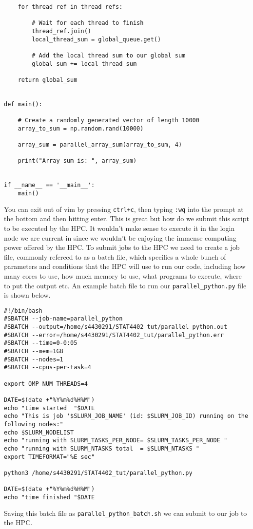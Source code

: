 \begin{verbatim}
    for thread_ref in thread_refs:

        # Wait for each thread to finish
        thread_ref.join()
        local_thread_sum = global_queue.get()

        # Add the local thread sum to our global sum
        global_sum += local_thread_sum

    return global_sum


def main():

    # Create a randomly generated vector of length 10000
    array_to_sum = np.random.rand(10000)

    array_sum = parallel_array_sum(array_to_sum, 4)

    print("Array sum is: ", array_sum)


if __name__ == '__main__':
    main()
\end{verbatim}

You can exit out of vim by pressing \texttt{ctrl+c}, then typing \texttt{:wq} into the prompt at the bottom and then hitting enter. This is great but how do we submit this script to be executed by the HPC. It wouldn't make sense to execute it in the login node we are current in since we wouldn't be enjoying the immense computing power offered by the HPC. To submit jobs to the HPC we need to create a job file, commonly refereed to as a batch file, which specifies a whole bunch of parameters and conditions that the HPC will use to run our code, including how many cores to use, how much memory to use, what programs to execute, where to put the output etc. An example batch file to run our \texttt{parallel\_python.py} file is shown below.
\begin{verbatim}
#!/bin/bash
#SBATCH --job-name=parallel_python
#SBATCH --output=/home/s4430291/STAT4402_tut/parallel_python.out
#SBATCH --error=/home/s4430291/STAT4402_tut/parallel_python.err
#SBATCH --time=0-0:05
#SBATCH --mem=1GB
#SBATCH --nodes=1
#SBATCH --cpus-per-task=4

export OMP_NUM_THREADS=4

DATE=$(date +"%Y%m%d%H%M")
echo "time started  "$DATE
echo "This is job '$SLURM_JOB_NAME' (id: $SLURM_JOB_ID) running on the following nodes:"
echo $SLURM_NODELIST
echo "running with SLURM_TASKS_PER_NODE= $SLURM_TASKS_PER_NODE "
echo "running with SLURM_NTASKS total  = $SLURM_NTASKS "
export TIMEFORMAT="%E sec"

python3 /home/s4430291/STAT4402_tut/parallel_python.py

DATE=$(date +"%Y%m%d%H%M")
echo "time finished "$DATE
\end{verbatim}
Saving this batch file as \texttt{parallel\_python\_batch.sh} we can submit to our job to the HPC.